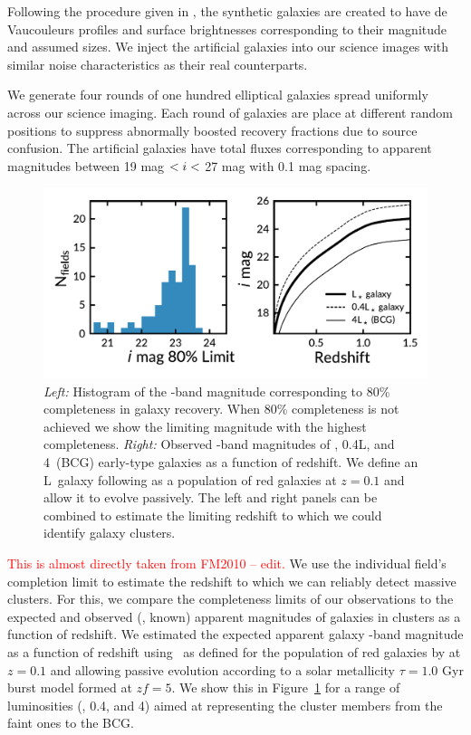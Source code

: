 \documentclass[apj, revtex4-1]{emulateapj}
\newcommand{\editorial}[1]{\textcolor{red}{#1}}
\begin{document}
Following the procedure given in \cite{Menanteau2010a}, the synthetic galaxies are created to have de Vaucouleurs \citep{DeVaucouleurs1948} profiles and surface brightnesses corresponding to their magnitude and assumed sizes. We inject the artificial galaxies into our science images with similar noise characteristics as their real counterparts.

We generate four rounds of one hundred elliptical galaxies spread uniformly across our science imaging. Each round of galaxies are place at different random positions to suppress abnormally boosted recovery fractions due to source confusion. The artificial galaxies have total fluxes corresponding to apparent magnitudes between 19 mag $< \hbox{$i$} <$ 27 mag with 0.1 mag spacing.

\begin{figure}
	\includegraphics[width=\textwidth]{figures/recovery_redshift.pdf}
	\caption{\textit{Left:} Histogram of the \sdssi-band magnitude corresponding to 80\% completeness in galaxy recovery. When 80\% completeness is not achieved we show the limiting magnitude with the highest completeness. \textit{Right:} Observed \sdssi-band magnitudes of \lstar, 0.4L\lstar, and 4\lstar\ (BCG) early-type galaxies as a function of redshift. We define an L\lstar\ galaxy following \cite{Blanton2003} as a population of red galaxies at $z = 0.1$ and allow it to evolve passively. The left and right panels can be combined to estimate the limiting redshift to which we could identify galaxy clusters.}
	\label{fig:recovery_redshift}
\end{figure}

\editorial{This is almost directly taken from FM2010 -- edit.} We use the individual field's completion limit to estimate the redshift to which we can reliably detect massive clusters. For this, we compare the completeness limits of our observations to the expected and observed (\ie, known) apparent magnitudes of galaxies in clusters as a function of redshift. We estimated the expected apparent galaxy \sdssi-band magnitude as a function of redshift using \lstar\ as defined for the population of red galaxies by \cite{Blanton2003} at $z = 0.1$ and allowing passive evolution according to a solar metallicity \citep{Bruzual2003} $\tau = 1.0$ Gyr burst model formed at $zf = 5$. We show this in Figure~\ref{fig:recovery_redshift} for a range of luminosities (\lstar, 0.4\lstar, and 4\lstar) aimed at representing the cluster members from the faint ones to the BCG.
\end{document}

